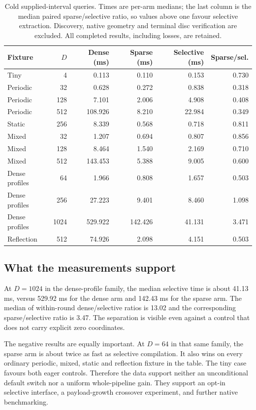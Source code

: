 \documentclass[11pt]{article}
\theoremstyle{definition}\newtheorem{definition}[theorem]{Definition}
\theoremstyle{remark}\newtheorem{remark}[theorem]{Remark}
\begin{document}
\begin{table}[htbp]
\centering\small
\begin{tabular}{lrrrrr}
\toprule
Fixture & $D$ & Dense (ms) & Sparse (ms) & Selective (ms) & Sparse/sel.\\
\midrule
Tiny & 4 & 0.113 & 0.110 & 0.153 & 0.730\\
Periodic & 32 & 0.628 & 0.272 & 0.838 & 0.318\\
Periodic & 128 & 7.101 & 2.006 & 4.908 & 0.408\\
Periodic & 512 & 108.926 & 8.210 & 22.984 & 0.349\\
Static & 256 & 8.339 & 0.568 & 0.718 & 0.811\\
Mixed & 32 & 1.207 & 0.694 & 0.807 & 0.856\\
Mixed & 128 & 8.464 & 1.540 & 2.169 & 0.710\\
Mixed & 512 & 143.453 & 5.388 & 9.005 & 0.600\\
Dense profiles & 64 & 1.966 & 0.808 & 1.657 & 0.503\\
Dense profiles & 256 & 27.223 & 9.401 & 8.460 & 1.098\\
Dense profiles & 1024 & 529.922 & 142.426 & 41.131 & 3.471\\
Reflection & 512 & 74.926 & 2.098 & 4.151 & 0.503\\
\bottomrule
\end{tabular}
\caption{Cold supplied-interval queries. Times are per-arm medians; the last column is the median paired sparse/selective ratio, so values above one favour selective extraction. Discovery, native geometry and terminal disc verification are excluded. All completed results, including losses, are retained.}
\label{tab:timings}
\end{table}


\subsection{What the measurements support}
At $D=1024$ in the dense-profile family, the median selective time is about
41.13 ms, versus 529.92 ms for the dense arm and 142.43 ms for the sparse arm.
The median of within-round dense/selective ratios is 13.02 and the corresponding
sparse/selective ratio is 3.47. The separation is visible even against a control
that does not carry explicit zero coordinates.

The negative results are equally important. At $D=64$ in that same family,
the sparse arm is about twice as fast as selective compilation. It also wins
on every ordinary periodic, mixed, static and reflection fixture in the table.
The tiny case favours both eager controls. Therefore the data support neither
an unconditional default switch nor a uniform whole-pipeline gain. They support
an opt-in selective interface, a payload-growth crossover experiment, and further
native benchmarking.
\end{document}
